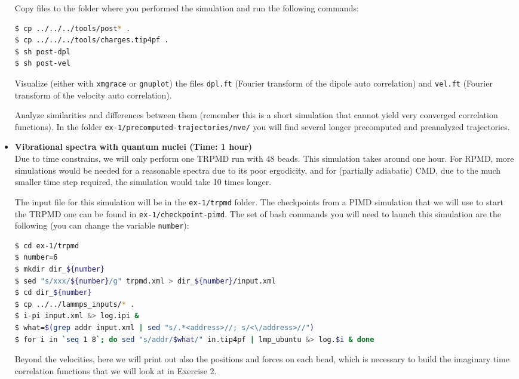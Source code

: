 \documentclass{article}
\begin{document}
\begin{Exercise}[label={realtime},title={Velocity and dipole real time correlation functions}]
\begin{itemize}
Copy files to the folder where you performed the simulation and run the following commands:

\begin{lstlisting}[language=Bash,emph={\$}]
$ cp ../../../tools/post* .
$ cp ../../../tools/charges.tip4pf .
$ sh post-dpl
$ sh post-vel
\end{lstlisting}

Visualize (either with \texttt{xmgrace} or \texttt{gnuplot}) the files \texttt{dpl.ft} (Fourier transform of the dipole auto correlation) and \texttt{vel.ft} (Fourier transform of the velocity auto correlation). 

Analyze similarities and differences between them (remember this is a short simulation that cannot yield very converged correlation functions). In the folder \texttt{ex-1/precomputed-trajectories/nve/} you will find several longer precomputed and preanalyzed trajectories.


\item {\bf Vibrational spectra with quantum nuclei (Time: 1 hour)} \\
Due to time constrains, we will only perform one TRPMD run with 48 beads.
This simulation takes around one hour. For RPMD, more simulations would be needed for a reasonable spectra due to its poor ergodicity, and for (partially adiabatic) CMD, due to the much smaller time step required, the simulation would take 10 times longer.

The input file for this simulation will be in the \texttt{ex-1/trpmd} folder. The checkpoints from a PIMD simulation that we will use to start the TRPMD one can be found in \texttt{ex-1/checkpoint-pimd}. The set of bash commands you will need to launch this simulation are the following (you can change the variable \texttt{number}):

\begin{lstlisting}[language=Bash,emph={\$}]
$ cd ex-1/trpmd
$ number=6
$ mkdir dir_${number} 
$ sed "s/xxx/${number}/g" trpmd.xml > dir_${number}/input.xml
$ cd dir_${number}
$ cp ../../lammps_inputs/* .
$ i-pi input.xml &> log.ipi &
$ what=$(grep addr input.xml | sed "s/.*<address>//; s/<\/address>//")
$ for i in `seq 1 8`; do sed "s/addr/$what/" in.tip4pf | lmp_ubuntu &> log.$i & done
\end{lstlisting}


Beyond the velocities, here we will print out also the positions and forces on each bead, which is necessary to build the imaginary time correlation functions that we will look at in Exercise 2.


\end{itemize}
\end{Exercise}
\end{document}
